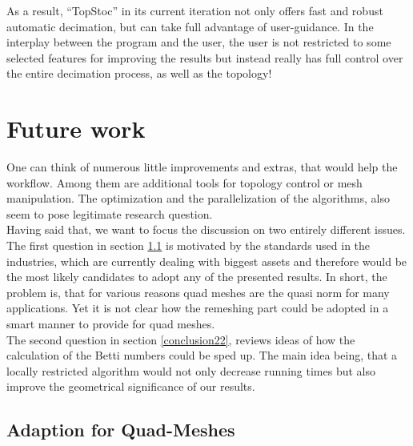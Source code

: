 As a result, ``TopStoc'' in its current iteration not only offers fast and robust automatic decimation, but can take full advantage of user-guidance.
In the interplay between the program and the user, the user is not restricted to some selected features for improving the results but instead really has full control over the entire decimation process, as well as the topology!

\section{Future work}
\label{conclusion2}

One can think of numerous little improvements and extras, that would help the workflow.
Among them are additional tools for topology control or mesh manipulation.
The optimization and the parallelization of the algorithms, also seem to pose legitimate research question.\\
Having said that, we want to focus the discussion on two entirely different issues.
The first question in section \ref{conclusion21} is motivated by the standards used in the industries, which are currently dealing with biggest assets and therefore would be the most likely candidates to adopt any of the presented results.
In short, the problem is, that for various reasons quad meshes are the quasi norm for many applications.
Yet it is not clear how the remeshing part could be adopted in a smart manner to provide for quad meshes.\\
The second question in section \ref{conclusion22}, reviews ideas of how the calculation of the Betti numbers could be sped up.
The main idea being, that a locally restricted algorithm would not only decrease running times but also improve the geometrical significance of our results.

\subsection{Adaption for Quad-Meshes}
\label{conclusion21}

